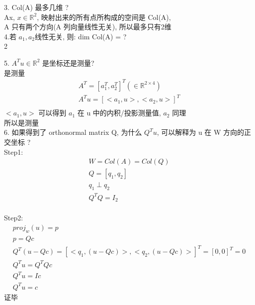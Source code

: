 \documentclass[12pt]{article}
\begin{document}
\begin{flushleft}
    3. Col(A) 最多几维 ? \\
    Ax, $x  \in  \mathbb{R}^{2}$, 映射出来的所有点所构成的空间是 Col(A), \\
    A 只有两个方向(A 列向量线性无关), 所以最多只有2维 \\

    4.若 $a_{1},a_{2}$线性无关, 则: dim Col(A) = ? \\
    2

    5. $A^{T}u \in \mathbb{R}^{2}$ 是坐标还是测量? \\
    是测量
    \begin{align}
        A^{T} = [a_{1}^{T},a_{2}^{T}]^{T} ( \in \mathbb{R}^{2 \times 4}) \\
        A^{T}u = [<a_{1},u>, <a_{2},u>]^{T}                              \\
    \end{align}
    $<a_{1},u>$ 可以得到 $a_{1}$ 在 u 中的内积/投影测量值, $a_{2}$ 同理 \\
    所以是测量 \\

    6. 如果得到了 orthonormal matrix Q, 为什么 $Q^{T}u$, 可以解释为 u 在 W 方向的正交坐标 ? \\
    Step1: \\
    \begin{align}
        W = Col(A) = Col(Q) \\
        Q = [q_{1},q_{2}]   \\
        q_{1} \perp q_{2}   \\
        Q^{T}Q = I_{2}      \\
    \end{align}

    Step2: \\
    \begin{align}
        proj_{w}(u) = p                                                          \\
        p = Qc                                                                   \\
        Q^{T}(u - Qc) = [<q_{1},(u - Qc)>, <q_{2},(u - Qc)>]^{T} = [0,0]^{T} = 0 \\
        Q^{T}u = Q^{T}Qc                                                         \\
        Q^{T}u = Ic                                                              \\
        Q^{T}u = c
    \end{align}
    证毕 \\


\end{flushleft}
\end{document}
